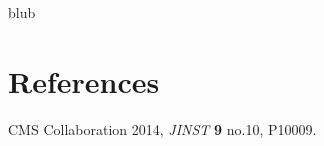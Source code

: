 \documentclass[a4paper]{jpconf}
\begin{document}
\ack
blub


\section{References}

\begin{thebibliography}{9}
\item CMS Collaboration 2014, {\it JINST} \textbf{9} no.10, P10009.


\end{thebibliography}
\end{document}
